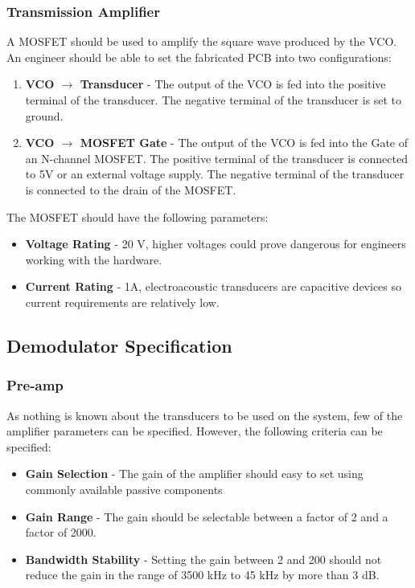 \subsubsection{Transmission Amplifier}
\label{sec:specificationTransmissionAmplifier}
A MOSFET should be used to amplify the square wave produced by the VCO.
An engineer should be able to set the fabricated PCB into two configurations:
\begin{enumerate}
    \item \textbf{VCO $\rightarrow$ Transducer} - The output of the VCO is fed into the positive terminal of the transducer.
    The negative terminal of the transducer is set to ground. 
    \item \textbf{VCO $\rightarrow$ MOSFET Gate} - The output of the VCO is fed into the Gate of an N-channel MOSFET. The positive terminal of the transducer is connected to 5V or an external voltage supply.
    The negative terminal of the transducer is connected to the drain of the MOSFET.
\end{enumerate}
The MOSFET should have the following parameters:
\begin{itemize}
    \item \textbf{Voltage Rating} - 20 V, higher voltages could prove dangerous for engineers working with the hardware.
    \item \textbf{Current Rating} - 1A, electroacoustic transducers are capacitive devices so current requirements are relatively low. 
\end{itemize}

\subsection{Demodulator Specification}

\subsubsection{Pre-amp}
\label{sec:specificationPreAmp}
As nothing is known about the transducers to be used on the system, few of the amplifier parameters can be specified.
However, the following criteria can be specified:
\begin{itemize}
    \item \textbf{Gain Selection} - The gain of the amplifier should easy to set using commonly available passive components
    \item \textbf{Gain Range} - The gain should be selectable between a factor of 2 and a factor of 2000.
    \item \textbf{Bandwidth Stability} - Setting the gain between 2 and 200 should not reduce the gain in the range of 3500 kHz to 45 kHz by more than 3 dB.
\end{itemize} 

